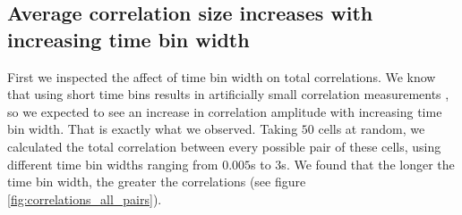     \subsection{Average correlation size increases with increasing time bin width}
    First we inspected the affect of time bin width on total correlations. We know that using short time bins results in artificially small correlation measurements \parencite{cohen2}, so we expected to see an increase in correlation amplitude with increasing time bin width. That is exactly what we observed. Taking $50$ cells at random, we calculated the total correlation between every possible pair of these cells, using different time bin widths ranging from $0.005$s to $3$s. We found that the longer the time bin width, the greater the correlations (see figure \ref{fig:correlations_all_pairs}).

